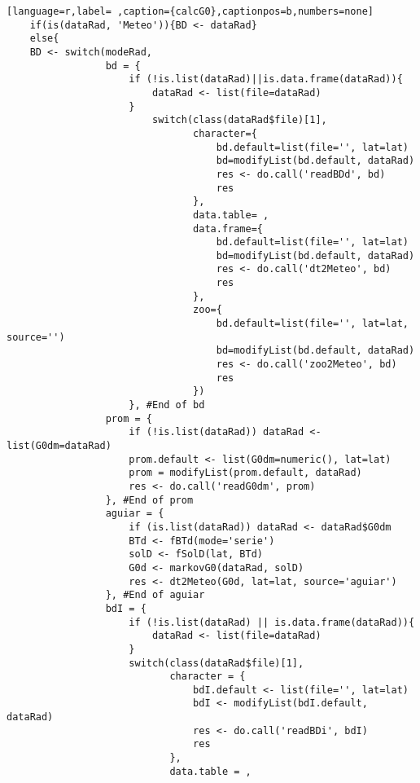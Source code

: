 \begin{lstlisting}[language=r,label= ,caption={calcG0},captionpos=b,numbers=none]
    if(is(dataRad, 'Meteo')){BD <- dataRad}
    else{
    BD <- switch(modeRad,
                 bd = {
                     if (!is.list(dataRad)||is.data.frame(dataRad)){
                         dataRad <- list(file=dataRad)
                     }
                         switch(class(dataRad$file)[1],
                                character={
                                    bd.default=list(file='', lat=lat)
                                    bd=modifyList(bd.default, dataRad)
                                    res <- do.call('readBDd', bd)
                                    res
                                },
                                data.table= ,
                                data.frame={
                                    bd.default=list(file='', lat=lat)
                                    bd=modifyList(bd.default, dataRad)
                                    res <- do.call('dt2Meteo', bd)
                                    res
                                },
                                zoo={
                                    bd.default=list(file='', lat=lat, source='')
                                    bd=modifyList(bd.default, dataRad)
                                    res <- do.call('zoo2Meteo', bd)
                                    res
                                })
                     }, #End of bd
                 prom = {
                     if (!is.list(dataRad)) dataRad <- list(G0dm=dataRad)
                     prom.default <- list(G0dm=numeric(), lat=lat)
                     prom = modifyList(prom.default, dataRad)
                     res <- do.call('readG0dm', prom)
                 }, #End of prom
                 aguiar = {
                     if (is.list(dataRad)) dataRad <- dataRad$G0dm
                     BTd <- fBTd(mode='serie')
                     solD <- fSolD(lat, BTd)
                     G0d <- markovG0(dataRad, solD)
                     res <- dt2Meteo(G0d, lat=lat, source='aguiar')
                 }, #End of aguiar
                 bdI = {
                     if (!is.list(dataRad) || is.data.frame(dataRad)){
                         dataRad <- list(file=dataRad)
                     }
                     switch(class(dataRad$file)[1],
                            character = {
                                bdI.default <- list(file='', lat=lat)
                                bdI <- modifyList(bdI.default, dataRad)
                                res <- do.call('readBDi', bdI)
                                res
                            },
                            data.table = ,

\end{lstlisting}
